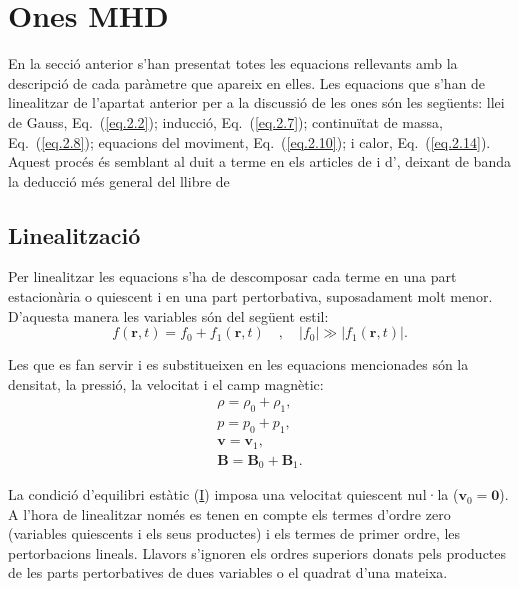 \documentclass[12pt,a4paper]{article}
\numberwithin{equation}{section}
\begin{document}
\clearpage


\section{Ones MHD} \label{sec:onesMHD}
En la secció anterior s'han presentat totes les equacions rellevants amb la descripció de cada paràmetre que apareix en elles.
Les equacions que s'han de linealitzar de l'apartat anterior per a la discussió de les ones són les següents:
llei de Gauss, Eq.~(\ref{eq.2.2}); inducció, Eq.~(\ref{eq.2.7}); continuïtat de massa, Eq.~(\ref{eq.2.8}); equacions del moviment, Eq.~(\ref{eq.2.10}); i calor, Eq.~(\ref{eq.2.14}).
Aquest procés és semblant al duit a terme en els articles de \textcite{oscillation_modes_II} i d'\textcite{oscillations_quiescent_solar_prominence},
deixant de banda la deducció més general del llibre de \textcite{Priest_2014}


\subsection{Linealització} \label{subsec:linealització}
Per linealitzar les equacions s'ha de descomposar cada terme en una part estacionària o quiescent i en una part pertorbativa, suposadament molt menor.
D'aquesta manera les variables són del següent estil:
\begin{equation}
    f(\bm{r},t) = f_0 + f_1(\bm{r},t) \quad , \quad |f_0| \gg |f_1(\bm{r},t)|. \tag{3.1} \label{3.1}
\end{equation}

Les que es fan servir i es substitueixen en les equacions mencionades són la densitat, la pressió, la velocitat i el camp magnètic:
\begin{gather}
    \rho = \rho_0 + \rho_1, \tag{3.2} \label{3.2} \\
    p = p_0 + p_1, \tag{3.3} \label{3.3} \\
    \bm{v} = \bm{v}_1, \tag{3.4} \label{3.4} \\
    \bm{B} = \bm{B}_0 + \bm{B}_1. \tag{3.5} \label{3.5}
\end{gather}

La condició d'equilibri estàtic (\hyperref[punt:I]{I}) imposa una velocitat quiescent nul·la ($\bm{v}_0 = \bm{0}$).
A l'hora de linealitzar només es tenen en compte els termes d'ordre zero (variables quiescents i els seus productes) i els termes de primer ordre, les pertorbacions lineals.
Llavors s'ignoren els ordres superiors donats pels productes de les parts pertorbatives de dues variables o el quadrat d'una mateixa.
\end{document}
